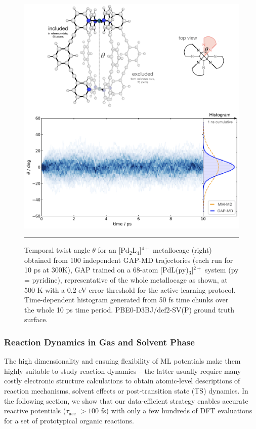 \documentclass[../../main.tex]{subfiles}
\newcommand{\taua}{$\tau_\text{acc}$ }
\begin{document}
\begin{figure}[h!]
	\vspace{0.4cm}
	\centering
	\includegraphics[width=14cm]{6/gap/figs_ms/fig4}
	\vspace{0.2cm}
	\hrule
	\caption{Temporal twist angle $\theta$ for an [Pd${}_2$L${}_4$]$^{4+}$ metallocage (right) obtained from 100 independent GAP-MD trajectories (each run for 10 ps at 300K), GAP trained on a 68-atom [PdL(py)${}_3$]$^{2+}$ system (py = pyridine), representative of the whole metallocage as shown, at 500 K with a 0.2 eV error threshold for the active-learning protocol. Time-dependent histogram generated from 50 fs time chunks over the whole 10 ps time period. PBE0-D3BJ/def2-SV(P) ground truth surface.}
	\label{fig::ml_4}
\end{figure}


\subsubsection{Reaction Dynamics in Gas and Solvent Phase}

The high dimensionality and ensuing flexibility of ML potentials make them highly suitable to study reaction dynamics – the latter usually require many costly electronic structure calculations to obtain atomic-level descriptions of reaction mechanisms, solvent effects or post-transition state (TS) dynamics.\cite{Pratihar2017, Ess2008} In the following section, we show that our data-efficient strategy enables accurate reactive potentials (\taua $> 100$ fs) with only a few hundreds of DFT evaluations for a set of prototypical organic reactions.
\end{document}
